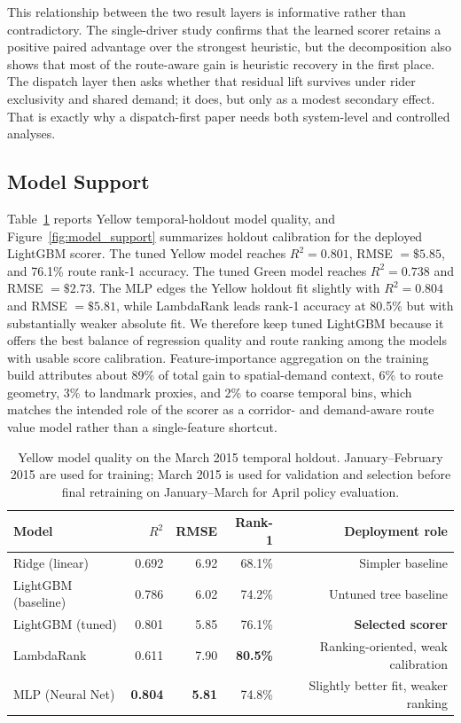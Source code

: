 \documentclass[journal]{IEEEtran}
\begin{document}
This relationship between the two result layers is informative rather than contradictory. The single-driver study confirms that the learned scorer retains a positive paired advantage over the strongest heuristic, but the decomposition also shows that most of the route-aware gain is heuristic recovery in the first place. The dispatch layer then asks whether that residual lift survives under rider exclusivity and shared demand; it does, but only as a modest secondary effect. That is exactly why a dispatch-first paper needs both system-level and controlled analyses.

\subsection{Model Support}
Table~\ref{tab:model_quality} reports Yellow temporal-holdout model quality, and Figure~\ref{fig:model_support} summarizes holdout calibration for the deployed LightGBM scorer. The tuned Yellow model reaches \(R^2=0.801\), RMSE \(=\$5.85\), and 76.1\% route rank-1 accuracy. The tuned Green model reaches \(R^2=0.738\) and RMSE \(=\$2.73\). The MLP edges the Yellow holdout fit slightly with \(R^2=0.804\) and RMSE \(=\$5.81\), while LambdaRank leads rank-1 accuracy at 80.5\% but with substantially weaker absolute fit. We therefore keep tuned LightGBM because it offers the best balance of regression quality and route ranking among the models with usable score calibration. Feature-importance aggregation on the training build attributes about 89\% of total gain to spatial-demand context, 6\% to route geometry, 3\% to landmark proxies, and 2\% to coarse temporal bins, which matches the intended role of the scorer as a corridor- and demand-aware route value model rather than a single-feature shortcut.

\begin{table}[!t]
\caption{Yellow model quality on the March 2015 temporal holdout. January--February 2015 are used for training; March 2015 is used for validation and selection before final retraining on January--March for April policy evaluation.}
\label{tab:model_quality}
\centering
\scriptsize
\setlength{\tabcolsep}{2.5pt}
\begin{tabular}{lrrrr}
\toprule
Model & \(R^2\) & RMSE & Rank-1 & Deployment role \\
\midrule
Ridge (linear) & 0.692 & 6.92 & 68.1\% & Simpler baseline \\
LightGBM (baseline) & 0.786 & 6.02 & 74.2\% & Untuned tree baseline \\
LightGBM (tuned) & 0.801 & 5.85 & 76.1\% & \textbf{Selected scorer} \\
LambdaRank & 0.611 & 7.90 & \textbf{80.5\%} & Ranking-oriented, weak calibration \\
MLP (Neural Net) & \textbf{0.804} & \textbf{5.81} & 74.8\% & Slightly better fit, weaker ranking \\
\bottomrule
\end{tabular}
\end{table}
\end{document}
